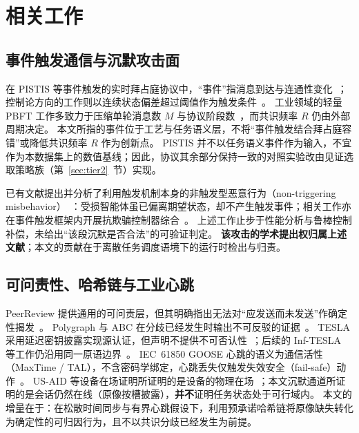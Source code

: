 \documentclass[manuscript,screen,review]{acmart}
\begin{document}
\section{相关工作}
\label{sec:related}

\subsection{事件触发通信与沉默攻击面}

在 PISTIS 等事件触发的实时拜占庭协议中，``事件''指消息到达与连通性变化~\cite{pistis2021}；控制论方向的工作则以连续状态偏差超过阈值作为触发条件~\cite{tac2025el,hdetm2024}。
工业领域的轻量 PBFT 工作多致力于压缩单轮消息数 $M$ 与协议阶段数~\cite{ccgridw2023pbft,sensors2024aloha}，而共识频率 $R$ 仍由外部周期决定。
本文所指的事件位于工艺与任务语义层，不将``事件触发结合拜占庭容错''或降低共识频率 $R$ 作为创新点。
PISTIS 并不以任务语义事件作为输入，不宜作为本数据集上的数值基线；因此，协议其余部分保持一致的对照实验改由见证选取策略族（第~\ref{sec:tier2}~节）实现。

已有文献提出并分析了利用触发机制本身的非触发型恶意行为（non-triggering misbehavior）~\cite{nontrigger2022}：受损智能体虽已偏离期望状态，却不产生触发事件；相关工作亦在事件触发框架内开展抗欺骗控制器综合~\cite{asjc2023contain,ijrnc2023deception}。
上述工作止步于性能分析与鲁棒控制补偿，未给出``该段沉默是否合法''的可验证判定。
\textbf{该攻击的学术提出权归属上述文献}；本文的贡献在于离散任务调度语境下的运行时检出与归责。

\subsection{可问责性、哈希链与工业心跳}

PeerReview 提供通用的可问责层，但其明确指出无法对``应发送而未发送''作确定性揭发~\cite{peerreview2007}。
Polygraph 与 ABC 在分歧已经发生时输出不可反驳的证据~\cite{polygraph2021,abc2023}。
TESLA 采用延迟密钥披露实现源认证，但声明不提供不可否认性~\cite{tesla2001,rfc4082}；后续的 Inf-TESLA 等工作仍沿用同一原语边界~\cite{inftesla2022}。
IEC~61850 GOOSE 心跳的语义为通信活性（MaxTime / TAL），不含密码学绑定，心跳丢失仅触发失效安全（fail-safe）动作~\cite{goose615}。
US-AID 等设备在场证明所证明的是设备的物理在场~\cite{usaid}；本文沉默通道所证明的是会话仍然在线（原像按槽披露），\textbf{并不}证明任务状态处于可行域内。
本文的增量在于：在松散时间同步与有界心跳假设下，利用预承诺哈希链将原像缺失转化为确定性的可归因行为，且不以共识分歧已经发生为前提。
\end{document}
